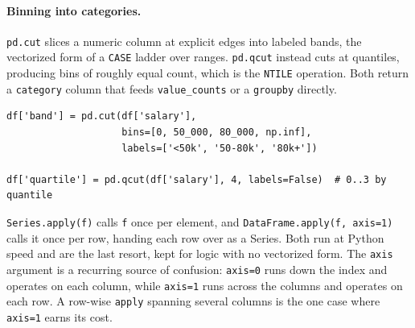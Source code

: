 \paragraph{Binning into categories.} \texttt{pd.cut} slices a numeric column at explicit edges into labeled bands, the vectorized form of a \texttt{CASE} ladder over ranges. \texttt{pd.qcut} instead cuts at quantiles, producing bins of roughly equal count, which is the \texttt{NTILE} operation. Both return a \texttt{category} column that feeds \texttt{value\_counts} or a \texttt{groupby} directly.

\newpage

\begin{lstlisting}[style=python, caption={Fixed-edge bins and equal-frequency bins}]
df['band'] = pd.cut(df['salary'],
                    bins=[0, 50_000, 80_000, np.inf],
                    labels=['<50k', '50-80k', '80k+'])

df['quartile'] = pd.qcut(df['salary'], 4, labels=False)  # 0..3 by quantile
\end{lstlisting}

\vspace{1ex}

\begin{keybox}
\texttt{Series.apply(f)} calls \texttt{f} once per element, and \texttt{DataFrame.apply(f, axis=1)} calls it once per row, handing each row over as a Series. Both run at Python speed and are the last resort, kept for logic with no vectorized form. The \texttt{axis} argument is a recurring source of confusion: \texttt{axis=0} runs down the index and operates on each column, while \texttt{axis=1} runs across the columns and operates on each row. A row-wise \texttt{apply} spanning several columns is the one case where \texttt{axis=1} earns its cost.
\end{keybox}
